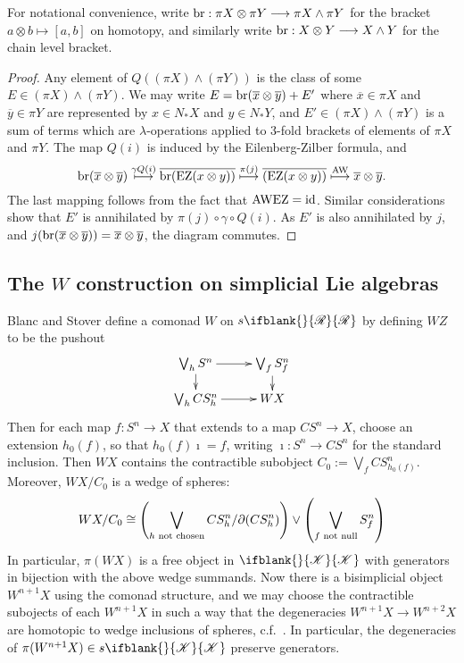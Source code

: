 \documentclass[10pt]{article}
\newcommand{\PRLie}[1]%
{\ifblank{#1}{\scrR}{\scrR^{#1}}}
\newcommand{\LL}[1]{\ifblank{#1}{\scrK}{\scrK^{#1}}}
\begin{document}
\begin{Grothendieck Multiplicativity}
For notational convenience, write $\textup{br}:\pi X\otimes \pi Y\to \pi X\wedge \pi Y$ for the bracket $a\otimes b\mapsto [a,b]$ on homotopy, and similarly write $\textup{br}:X\otimes Y\to X\wedge Y$ for the chain level bracket.

\begin{proof}
Any element of $Q((\pi X)\wedge (\pi Y))$ is the class of some $E\in (\pi X)\wedge (\pi Y)$. We may write $E=\textup{br}(\overline{x}\otimes\overline{y})+E'$ where $\overline{x}\in\pi X$ and $\overline{y}\in\pi Y$ are represented by $x\in N_*X$ and $y\in N_*Y$, and $E'\in(\pi X)\wedge (\pi Y)$ is a sum of terms which are $\lambda$-operations applied to 3-fold brackets of elements of $\pi X$ and $\pi Y$. The map $Q(i)$ is induced by the Eilenberg-Zilber formula, and
\[\textup{br}(\overline{x}\otimes\overline{y})\overset{\gamma\circ Q(i)}{\mapsto}\overline{\textup{br}(\textup{EZ}(x\otimes y))}\overset{\pi(j)}{\mapsto}\overline{(\textup{EZ}(x\otimes y))}\overset{\textup{AW}}{\mapsto}\overline{x}\otimes \overline{y}.\]
The last mapping follows from the fact that $\textup{AW}\circ\textup{EZ}=\textup{id}$.
Similar considerations show that $E'$ is annihilated by $\pi(j)\circ\gamma\circ Q(i)$. As $E'$ is also annihilated by $j$, and $j(\textup{br}(\overline{x}\otimes\overline{y}))=\overline{x}\otimes\overline{y}$, the diagram commutes.
\end{proof}
\subsection{The $W$ construction on simplicial Lie algebras}
Blanc and Stover \cite{Blanc_Stover-Groth_SS.pdf} define a comonad $W$ on $s\PRLie{}$ by defining $WZ$ to be the pushout
\[\xymatrix@R=4mm{
\bigvee_{h}S^n
\ar[r]\ar[d]
&%
\bigvee_{f}S^n_f\ar[d]\\%
\bigvee_{h}CS^n_h
\ar[r]&%
WX%
}\]
Then for each map $f:S^n\to X$ that extends to a map $CS^n\to X$, choose an extension $h_0(f)$, so that $h_0(f)\imath=f$, writing $\imath:S^n\to CS^n$ for the standard inclusion. Then $WX$ contains the contractible subobject $C_0:=\bigvee_f CS^n_{h_0(f)}$. Moreover, $WX/C_0$ is a wedge of spheres:
\[WX/C_0\cong \left(\bigvee_{h\textup{ not chosen}}CS^n_h/\partial(CS^n_h)\right)\vee\left(\bigvee_{f\textup{ not null}}S^n_f\right)\]
In particular, $\pi(WX)$ is a free object in $\LL{}$ with generators in bijection with the above wedge summands. Now there is a bisimplicial object $W^{n+1}X$ using the comonad structure, and we may choose the contractible subojects of each $W^{n+1}X$ in such a way that the degeneracies $W^{n+1}X\to W^{n+2}X$ are homotopic to wedge inclusions of spheres, c.f.\ \cite{StoverVanKampen.pdf}. In particular, the degeneracies of $\pi(W^{n+1}X)\in s\LL{}$ preserve generators.


\end{Grothendieck Multiplicativity}
\end{document}
